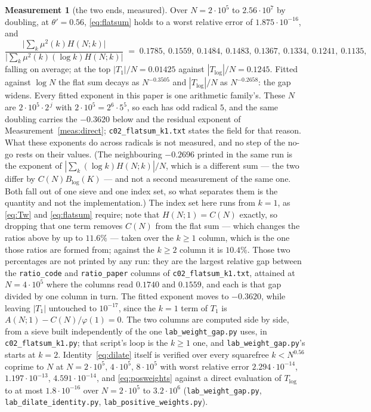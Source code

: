 \documentclass[11pt,a4paper]{article}
\theoremstyle{plain}
\theoremstyle{definition}
\newtheorem{measurement}[theorem]{Measurement}
\theoremstyle{remark}
\begin{document}
\begin{measurement}[the two ends, measured]\label{meas:flatsum}
Over $N=2\cdot10^5$ to $2.56\cdot10^7$ by doubling, at
$\theta'=0.56$, \eqref{eq:flatsum} holds to a worst relative error of
$1.875\cdot10^{-16}$, and
\[
  \frac{\bigl|\sum_k\mu^2(k)H(N;k)\bigr|}{\bigl|\sum_k\mu^2(k)(\log k)H(N;k)\bigr|}
  \;=\;0.1785,\ 0.1559,\ 0.1484,\ 0.1483,\ 0.1367,\ 0.1334,\
       0.1241,\ 0.1135,
\]
falling on average; at the top $|T_1|/N=0.01425$ against
$|T_{\log}|/N=0.1245$. Fitted against $\log N$ the flat sum decays as
$N^{-0.3505}$ and $|T_{\log}|/N$ as $N^{-0.2658}$: the gap widens.
Every fitted exponent in this paper is one arithmetic family's. These
$N$ are $2\cdot10^5\cdot2^{\,j}$ with $2\cdot10^5=2^6\cdot5^5$, so each
has odd radical $5$, and the same doubling carries the $-0.3620$ below
and the residual exponent of Measurement~\ref{meas:direct};
\texttt{c02\_flatsum\_k1.txt} states the field for that reason. What
these exponents do across radicals is not measured, and no step of the
no-go rests on their values. (The
neighbouring $-0.2696$ printed in the same run is the exponent of
$|\sum_k(\log k)H(N;k)|/N$, which is a different sum --- the two differ
by $C(N)B_{\log}(K)$ --- and not a second measurement of the same one.
Both fall out of one sieve and one index set, so what separates them is
the quantity and not the implementation.) The index set here runs from $k=1$, as \eqref{eq:Tw} and
\eqref{eq:flatsum} require; note that $H(N;1)=C(N)$ exactly, so
dropping that one term removes $C(N)$ from the flat sum --- which
changes the ratios above by up to $11.6\%$ --- taken over the $k\ge1$
column, which is the one those ratios are formed from; against the
$k\ge2$ column it is $10.4\%$. Those two percentages are not printed by
any run: they are the largest relative gap between the
\texttt{ratio\_code} and \texttt{ratio\_paper} columns of
\texttt{c02\_flatsum\_k1.txt}, attained at $N=4\cdot10^5$ where the
columns read $0.1740$ and $0.1559$, and each is that gap divided by one
column in turn. The fitted exponent moves to
$-0.3620$, while leaving $|T_1|$ untouched to $10^{-17}$, since the
$k=1$ term of $T_1$ is $A(N;1)-C(N)/\varphi(1)=0$. The two columns are
computed side by side, from a sieve built independently of the one
\texttt{lab\_weight\_gap.py} uses, in
\texttt{c02\_flatsum\_k1.py}; that script's loop is the $k\ge1$ one,
and \texttt{lab\_weight\_gap.py}'s starts at $k=2$. Identity~\eqref{eq:dilate} itself is verified over every
squarefree $k<N^{0.56}$ coprime to $N$ at
$N=2\cdot10^5,\,4\cdot10^5,\,8\cdot10^5$ with worst relative error
$2.294\cdot10^{-14}$, $1.197\cdot10^{-13}$, $4.591\cdot10^{-14}$, and
\eqref{eq:posweights} against a direct evaluation of $T_{\log}$ to at
most $1.8\cdot10^{-16}$ over $N=2\cdot10^5$ to $3.2\cdot10^6$
(\texttt{lab\_weight\_gap.py}, \texttt{lab\_dilate\_identity.py},
\texttt{lab\_positive\_weights.py}).
\end{measurement}
\end{document}

